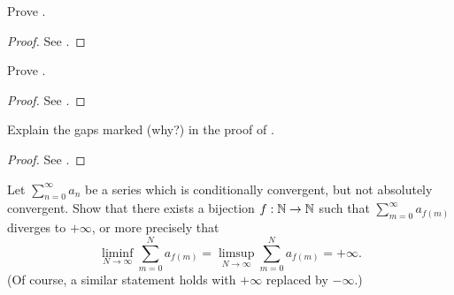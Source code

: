 \begin{ex}\label{i:ex:8.2.3}
  Prove .
\end{ex}

\begin{proof}
  See .
\end{proof}

\begin{ex}\label{i:ex:8.2.4}
  Prove .
\end{ex}

\begin{proof}
  See .
\end{proof}

\begin{ex}\label{i:ex:8.2.5}
  Explain the gaps marked (why?) in the proof of .
\end{ex}

\begin{proof}
  See .
\end{proof}

\begin{ex}\label{i:ex:8.2.6}
  Let \(\sum_{n = 0}^\infty a_n\) be a series which is conditionally convergent, but not absolutely convergent.
  Show that there exists a bijection \(f : \mathbb{N} \to \mathbb{N}\) such that \(\sum_{m = 0}^\infty a_{f(m)}\) diverges to \(+\infty\), or more precisely that
  \[
    \liminf_{N \to \infty} \sum_{m = 0}^N a_{f(m)} = \limsup_{N \to \infty} \sum_{m = 0}^N a_{f(m)} = +\infty.
  \]
  (Of course, a similar statement holds with \(+\infty\) replaced by \(-\infty\).)
\end{ex}

